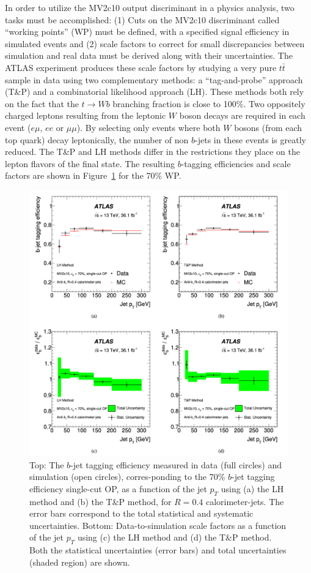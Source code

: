 In order to utilize the MV2c10 output discriminant in a physics analysis, two tasks must be accomplished: (1) Cuts on the MV2c10 discriminant called ``working points'' (WP) must be defined, with a specified signal efficiency in simulated events and (2) scale factors to correct for small discrepancies between simulation and real data must be derived along with their uncertainties.
The ATLAS experiment produces these scale factors by studying a very pure $t\bar{t}$ sample in data using two complementary methods: a ``tag-and-probe'' approach (T\&P) and a combinatorial likelihood approach (LH).
These methods both rely on the fact that the $t \rightarrow Wb$ branching fraction is close to 100\%.
Two oppositely charged leptons resulting from the leptonic $W$ boson decays are required in each event ($e\mu$, $ee$ or $\mu\mu$).
By selecting only events where both $W$ bosons (from each top quark) decay leptonically, the number of non $b$-jets in these events is greatly reduced. The T\&P and LH methods differ in the restrictions they place on the lepton flavors of the final state. The resulting $b$-tagging efficiencies and scale factors are shown in Figure~\ref{fig:b_tagging_eff_sf} for the 70\% WP.

\begin{figure}
	\centering
	\includegraphics[width=\textwidth]{b_tagging_eff_sf}
	\caption{
	Top: The $b$-jet tagging efficiency measured in data (full circles) and simulation (open circles), corres-ponding to the 70\% $b$-jet tagging efficiency single-cut OP, as a function of the jet $p_T$ using (a) the LH method and (b) the T\&P method, for $R = 0.4$ calorimeter-jets. The error bars correspond to the total statistical and systematic uncertainties. Bottom: Data-to-simulation scale factors as a function of the jet $p_T$ using (c) the LH method and (d) the T\&P method. Both the statistical uncertainties (error bars) and total uncertainties (shaded region) are shown.
    \cite{Aaboud:2018xwy}
	}
	\label{fig:b_tagging_eff_sf}
\end{figure}


